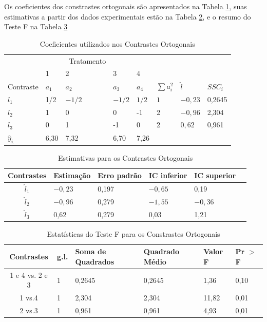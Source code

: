 \documentclass[a4paper,12pt,notitlepage]{article}
\begin{document}
Os coeficientes dos constrastes ortogonais são apresentados na Tabela \ref{tabela:coef_contrastes}, suas estimativas a partir dos dados experimentais estão na Tabela \ref{tabela:est_contrastes}, e o resumo do Teste F na Tabela \ref{tabela:teste_contrastes}






\begin{table}[htb]
    \centering
    \begin{tabular}{p{15mm} m{15mm} m{15mm} m{15mm} m{15mm} m{15mm} m{15mm} m{15mm}}
        ~&~&~Tratamento& \\\cline{2-5}
        ~& 1  &2 &3  &4 \\\hline
        Contraste & $a_1$&$a_2$&$a_3$&$a_4$&$\sum a_i^2$&$\hat{l}$&$SSC_i$\\\hline
        $l_1$&1/2&$-1/2$&$-1/2$&$1/2$&$1$&$-0,23$&0,2645\\\hline
        $l_2$&1&$0$&$0$&-1&2&$-0,96$&2,304\\\hline
        $l_3$&$0$&1&-1&0&2&$0,62$&0,961\\\hline
        $\hat{y}_{i.}$&6,30&7,32&6,70&7,26\\
    \end{tabular}
    \caption{Coeficientes utilizados nos Contrastes Ortogonais}
\label{tabela:coef_contrastes}
\end{table}

\begin{table}[htb]
    \centering
    \begin{tabular}{c||p{17mm}|p{17mm}|p{17mm}|p{17mm}|p{17mm}}
         Contrastes& Estimação&Erro padrão&IC inferior&IC superior  \\\hline\hline
        $\hat{l}_1$&$-0,23$ & 0,197&$-0,65$&0,19 \\
        $\hat{l}_2$&$-0,96$&0,279&$-1,55$&$-0,36$\\
        $\hat{l}_3$&0,62&0,279&0,03&1,21\\
    \end{tabular}\caption{Estimativas para os Contrastes Ortogonais}\label{tabela:est_contrastes}
\end{table}



\begin{table}[htb]
\centering
    \begin{tabular}{c||p{17mm}|p{17mm}|p{17mm}|p{17mm}|p{17mm}}
         Contrastes&g.l.&Soma de Quadrados&Quadrado Médio&Valor F&Pr $>$ F  \\\hline\hline
         1 e 4 vs. 2 e 3& 1 & 0,2645&0,2645&1,36&0,10 \\
         1 vs.4& 1 & 2,304&2,304&11,82&0,01\\
         2 vs.3& 1&0,961&0,961&4,93&0,01\\
    \end{tabular}\caption{Estatísticas do Teste F para os Constrastes Ortogonais}\label{tabela:teste_contrastes}
\end{table}
\end{document}

